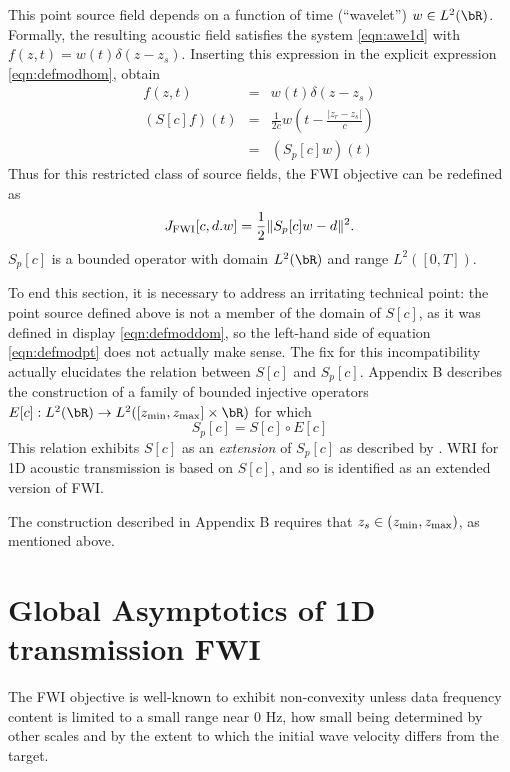 This point source field depends on a function of time (``wavelet'')
$w \in L^2(\bR)$. Formally, the resulting acoustic field satisfies the
system \ref{eqn:awe1d} with $f(z,t)=w(t)\delta(z-z_s)$. Inserting this
expression in the explicit expression \ref{eqn:defmodhom}, obtain
\begin{eqnarray}
  f(z,t) & = & w(t)\delta(z-z_s)\nonumber\\
  (S[c]f)(t) &=& \frac{1}{2c}w\left(t -
                              \frac{|z_r-z_s|}{c}\right)\nonumber\\
  &= &(S_p[c]w)(t)
  \label{eqn:defmodpt}
\end{eqnarray}
Thus for this restricted class of source fields, the FWI objective can be redefined as
\begin{equation}
  \label{eqn:deffwipt}
  J_{\rm FWI}[c,d.w] = \frac{1}{2}\|S_p[c]w -d\|^2.
\end{equation}
$S_p[c]$ is a bounded operator with domain $L^2(\bR)$ and range $L^2([0,T])$. 

To end this section, it is necessary to address an irritating
technical point: the point source defined above is not a member of the
domain of $S[c]$, as it was defined in display \ref{eqn:defmoddom}, so
the left-hand side of equation \ref{eqn:defmodpt} does not actually
make sense. The fix for this incompatibility actually elucidates the
relation between $S[c]$ and $S_p[c]$. Appendix B describes the
construction of a family of bounded injective operators  $E[c]: L^2(\bR) \rightarrow L^2([z_{\rm min},z_{\rm max}] \times \bR)$ for which
\begin{equation}
  \label{eqn:ext}
  S_p[c] = S[c] \circ E[c]
\end{equation}
This relation exhibits $S[c]$ as an {\em extension} of $S_p[c]$ as
described by \cite{Symes:09}. WRI for 1D acoustic transmission is
based on $S[c]$, and so is identified as an extended version of FWI.

The construction described in Appendix B requires that $z_s \in
(z_{\rm min},z_{\rm max})$, as mentioned above.

\section{Global Asymptotics of 1D transmission FWI}
The FWI objective is well-known to exhibit non-convexity unless
data frequency content is limited to a small range near 0 Hz, how
small being determined by other scales and by the extent to which the
initial wave velocity differs from the target.

